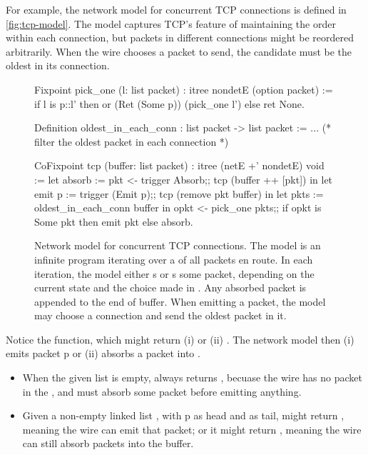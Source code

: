 For example, the network model for concurrent TCP connections is defined in
\autoref{fig:tcp-model}.  The model captures TCP's feature of maintaining the
order within each connection, but packets in different connections might be
reordered arbitrarily.  When the wire chooses a packet to send, the candidate
must be the oldest in its connection.

\begin{figure}
\begin{coq}
Fixpoint pick_one (l: list packet) : itree nondetE (option packet) :=
  if l is p::l'
  then or (Ret (Some p)) (pick_one l')
  else ret None.

Definition oldest_in_each_conn : list packet -> list packet := ...
(* filter the oldest packet in each connection *)

CoFixpoint tcp (buffer: list packet) : itree (netE +' nondetE) void :=
  let absorb := pkt <- trigger Absorb;;
                tcp (buffer ++ [pkt])      in
  let emit p := trigger (Emit p);;
                tcp (remove pkt buffer)    in
  let pkts   := oldest_in_each_conn buffer in
  opkt <- pick_one pkts;;
  if opkt is Some pkt
  then emit pkt
  else absorb.
\end{coq}
\caption[Network model for concurrent TCP connections]{Network model for
  concurrent TCP connections.  The model is an infinite program iterating over a
   of all packets en route.  In each iteration, the model either
  s or s some packet, depending on the current
   state and the choice made in .  Any absorbed packet
  is appended to the end of buffer.  When emitting a packet, the model may
  choose a connection and send the oldest packet in it.}
\label{fig:tcp-model}
\end{figure}

Notice the  function, which might return (i)  or (ii)
.  The network model then (i) emits packet \ilc p or (ii) absorbs a
packet into .

\begin{itemize}
\item When the given list  is empty,  always returns
  , becuase the wire has no packet in the , and must
  absorb some packet before emitting anything.
\item Given a non-empty linked list , with \ilc p as head and
   as tail,  might return , meaning the wire
  can emit that packet; or it might return , meaning the wire can
  still absorb packets into the buffer.
\end{itemize}

